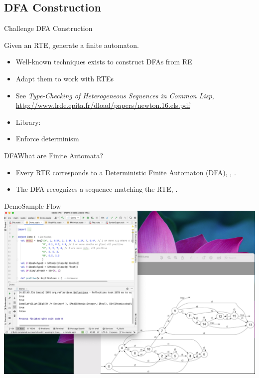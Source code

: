 \subsection{DFA Construction}

{  
\begin{frame}{Challenge }{DFA Construction}

  Given an RTE, generate a finite automaton.

  \begin{itemize}
  \item Well-known techniques exists to construct DFAs from RE
  \item Adapt them to work with RTEs
  \item See \emph{Type-Checking of Heterogeneous Sequences in Common Lisp},
    \url{http://www.lrde.epita.fr/dload/papers/newton.16.els.pdf}
  \item Library: 
  \item Enforce determinism
  \end{itemize}
\end{frame}

}

\begin{frame}{DFA}{What are Finite Automata?}
  \scalebox{0.75}{}
  \begin{itemize}
  \item   Every RTE corresponds to a Deterministic Finite Automaton (DFA), , .

  \item   The DFA recognizes a sequence matching the RTE, .

  \end{itemize}
\end{frame}



\begin{frame}{Demo}{Sample Flow}
  \centering
   \includegraphics[height=0.8\textheight]{demo.png}
\end{frame}


